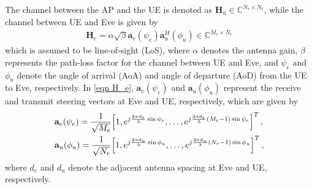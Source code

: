 \documentclass[journal]{IEEEtran}
\begin{document}
The channel between the AP and the UE is denoted as $\mathbf{H}_u \in \mathbb{C}^{N_r \times N_t}$, while the channel between UE and Eve is given by
\begin{align}
\mathbf{H}_{e} = \alpha\sqrt{\beta}\mathbf{a}_e(\psi_e) \mathbf{a}_{u}^H(\phi_{u}) \in \mathbb{C}^{M_e \times N_r} \label{eqn H_e}
\end{align}
which is assumed to be line-of-sight (LoS), where $\alpha$ denotes the antenna gain, $\beta$ represents the path-loss factor for the channel between UE and Eve, and $\psi_e$ and $\phi_{u}$ denote the angle of arrival (AoA) and angle of departure (AoD) from the UE to Eve, respectively. In \eqref{eqn H_e}, $\mathbf{a}_e(\psi_e)$ and $\mathbf{a}_{u}(\phi_{u})$ represent the receive and transmit steering vectors at Eve and UE, respectively, which are given by
\begin{align}
&\mathbf{a}_e(\psi_e) = \frac{1}{\sqrt{M_e}}\!\left[1, e^{j\frac{2\pi d_e}{\lambda}\sin\psi_e}, \dots, e^{j\frac{2\pi d_e}{\lambda}(M_e-1)\sin\psi_e}\right]^T,\notag\\
&\mathbf{a}_{u}(\phi_u) = \frac{1}{\sqrt{N_r}}\!\left[1, e^{j\frac{2\pi d_u}{\lambda}\sin\phi_{u}}, \dots, e^{j\frac{2\pi d_u}{\lambda}(N_r-1)\sin\phi_{u}}\right]^T,\notag
\end{align}
where $d_e$ and $d_u$ denote the adjacent antenna spacing at Eve and UE, respectively.
\end{document}
